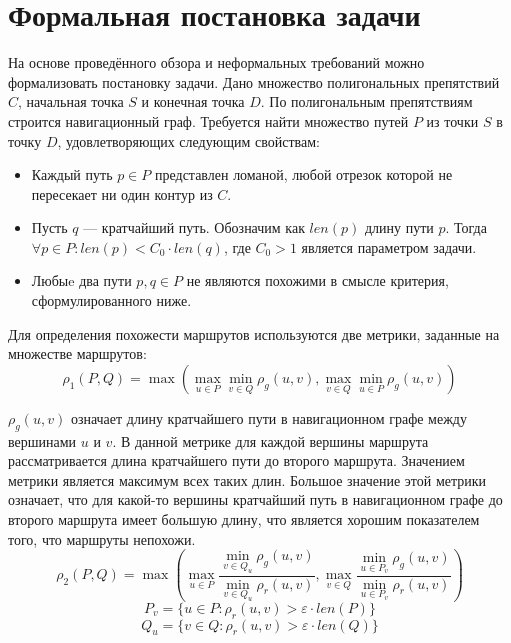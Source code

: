 \FloatBarrier

\section{Формальная постановка задачи}

\label{sec:formal-task}

На основе проведённого обзора и неформальных требований можно
формализовать постановку задачи. Дано множество полигональных
препятствий $C$, начальная точка $S$ и конечная точка $D$. По
полигональным препятствиям строится навигационный граф. Требуется
найти множество путей $P$ из точки $S$ в точку $D$, удовлетворяющих
следующим свойствам:
\begin{itemize}
  \item Каждый путь $p \in P$ представлен ломаной, любой отрезок
    которой не пересекает ни один контур из $C$.
  \item Пусть $q$ --- кратчайший путь. Обозначим как $len(p)$ длину пути $p$.
    Тогда $\forall p \in P: len(p) < C_0 \cdot len(q)$, где $C_0 > 1$
    является параметром задачи.
  \item Любыe два пути $p, q \in P$ не являются похожими в смысле
    критерия, сформулированного ниже.
\end{itemize}

Для определения похожести маршрутов используются две метрики,
заданные на множестве маршрутов:
\begin{equation*}
    \rho_1 (P, Q) = \max(\max_{u \in P} \min_{v \in Q} \rho_g(u,
    v), \max_{v \in Q} \min_{u \in P} \rho_g(u, v))
\end{equation*}

$\rho_g(u, v)$ означает длину кратчайшего пути в навигационном графе
между вершинами $u$ и $v$. В данной метрике для каждой вершины
маршрута рассматривается длина кратчайшего пути до второго маршрута.
Значением метрики является максимум всех таких длин. Большое значение
этой метрики означает, что для какой-то вершины кратчайший путь в
навигационном графе до второго маршрута имеет большую длину, что
является хорошим показателем того, что маршруты непохожи.
\begin{equation*}
    \rho_2 (P, Q) = \max(\max_{u \in P} \frac{\min\limits_{v \in Q_u}
    \rho_g(u, v)}{\min\limits_{v \in Q_u} \rho_r(u, v)}, \max\limits_{v \in Q} \frac{\min\limits_{u \in P_v}
    \rho_g(u, v)}{\min\limits_{u \in P_v} \rho_r(u, v)})
\end{equation*}
\begin{equation*}
    P_v = \{ u \in P : \rho_r(u, v) > \varepsilon \cdot len(P) \}
\end{equation*}
\begin{equation*}
    Q_u = \{ v \in Q : \rho_r(u, v) > \varepsilon \cdot len(Q) \}
\end{equation*}


